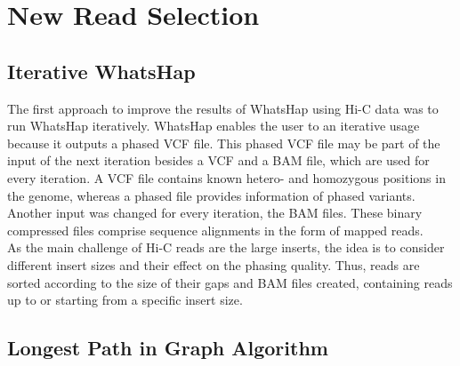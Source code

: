 \chapter{New Read Selection}
\label{chapter:newRS}
\section{Iterative WhatsHap}
\label{section:itWhatsHap}
The first approach to improve the results of WhatsHap using Hi-C data was to run WhatsHap iteratively. WhatsHap enables the user to an iterative usage because it outputs a phased \acf{VCF} file. This phased \ac{VCF} file may be part of the input of the next iteration besides a \ac{VCF} and a \acf{BAM} file, which are used for every iteration. A \ac{VCF} file contains known hetero- and homozygous positions in the genome, whereas a phased file provides information of phased variants.  Another input was changed for every iteration, the \ac{BAM} files. These binary compressed files comprise sequence alignments in the form of mapped reads.\\
As the main challenge of Hi-C reads are the large inserts, the idea is to consider different insert sizes and their effect on the phasing quality. Thus, reads are sorted according to the size of their gaps and BAM files created, containing reads up to or starting from a specific insert size.

\section{Longest Path in Graph Algorithm}
\label{section:longPath}